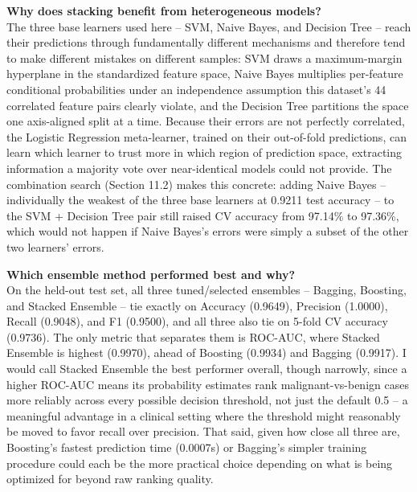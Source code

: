 \documentclass[11pt,a4paper]{article}
\begin{document}
\textbf{Why does stacking benefit from heterogeneous models?}\\
The three base learners used here -- SVM, Naive Bayes, and Decision Tree -- reach their predictions through fundamentally different mechanisms and therefore tend to make different mistakes on different samples: SVM draws a maximum-margin hyperplane in the standardized feature space, Naive Bayes multiplies per-feature conditional probabilities under an independence assumption this dataset's 44 correlated feature pairs clearly violate, and the Decision Tree partitions the space one axis-aligned split at a time. Because their errors are not perfectly correlated, the Logistic Regression meta-learner, trained on their out-of-fold predictions, can learn which learner to trust more in which region of prediction space, extracting information a majority vote over near-identical models could not provide. The combination search (Section 11.2) makes this concrete: adding Naive Bayes -- individually the weakest of the three base learners at 0.9211 test accuracy -- to the SVM + Decision Tree pair still raised CV accuracy from 97.14\% to 97.36\%, which would not happen if Naive Bayes's errors were simply a subset of the other two learners' errors.

\textbf{Which ensemble method performed best and why?}\\
On the held-out test set, all three tuned/selected ensembles -- Bagging, Boosting, and Stacked Ensemble -- tie exactly on Accuracy (0.9649), Precision (1.0000), Recall (0.9048), and F1 (0.9500), and all three also tie on 5-fold CV accuracy (0.9736). The only metric that separates them is ROC-AUC, where Stacked Ensemble is highest (0.9970), ahead of Boosting (0.9934) and Bagging (0.9917). I would call Stacked Ensemble the best performer overall, though narrowly, since a higher ROC-AUC means its probability estimates rank malignant-vs-benign cases more reliably across every possible decision threshold, not just the default 0.5 -- a meaningful advantage in a clinical setting where the threshold might reasonably be moved to favor recall over precision. That said, given how close all three are, Boosting's fastest prediction time (0.0007s) or Bagging's simpler training procedure could each be the more practical choice depending on what is being optimized for beyond raw ranking quality.

\end{document}
